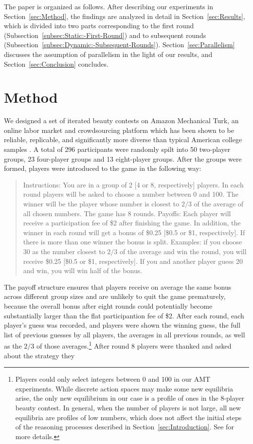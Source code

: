 \documentclass[12pt,review]{elsarticle}
\begin{document}
The paper is organized as follows. After describing our experiments
in Section~\ref{sec:Method}, the findings are analyzed in detail
in Section~\ref{sec:Results}, which is divided into two parts corresponding
to the first round (Subsection~\ref{subsec:Static:-First-Round})
and to subsequent rounds (Subsection~\ref{subsec:Dynamic:-Subsequent-Rounds}).
Section~\ref{sec:Parallelism} discusses the assumption of parallelism
in the light of our results, and Section~\ref{sec:Conclusion} concludes. 

\section{Method\label{sec:Method}}
\noindent
We designed a set of iterated beauty contests on Amazon Mechanical
Turk, an online labor market and crowdsourcing platform which has
been shown to be reliable, replicable, and significantly more diverse
than typical American college samples \citep{BuhrmesterEtAl2011,CrumpEtAl13,HortonEtAl2011,Rand2012}.
A total of 296 participants were randomly spilt into 50 two-player
groups, 23 four-player groups and 13 eight-player groups. After the
groups were formed, players were introduced to the game in the following
way:
\begin{quote}
Instructions: You are in a group of 2 {[}4 or 8, respectively{]} players.
In each round players will be asked to choose a number between 0 and
100. The winner will be the player whose number is closest to $2/3$
of the average of all chosen numbers. The game has 8 rounds. Payoffs:
Each player will receive a participation fee of \$2 after finishing
the game. In addition, the winner in each round will get a bonus of
\$0.25 {[}\$0.5 or \$1, respectively{]}. If there is more than one
winner the bonus is split. Examples: if you choose 30 as the number
closest to $2/3$ of the average and win the round, you will receive
\$0.25 {[}\$0.5 or \$1, respectively{]}. If you and another player
guess 20 and win, you will win half of the bonus.
\end{quote}
The payoff structure ensures that players receive on average the same
bonus across different group sizes and are unlikely to quit the game
prematurely, because the overall bonus after eight rounds could potentially become substantially larger than the flat participantion fee of \$2. After each round, each player's guess was recorded, and
players were shown the winning guess, the full list of previous guesses
by all players, the averages in all previous rounds, as well as the
$2/3$ of those averages.\footnote{Players could only select integers between 0 and 100 in our AMT experiments.
While discrete action spaces may make some new equilibria arise, the
only new equilibrium in our case is a profile of ones in the 8-player
beauty contest. In general, when the number of players is not large,
all new equilibria are profiles of low numbers, which does not affect
the initial steps of the reasoning processes described in Section~\ref{sec:Introduction}.
See \citet{SeelTsakas17} for more details.} After round 8 players were thanked and asked about the strategy they
\end{document}
